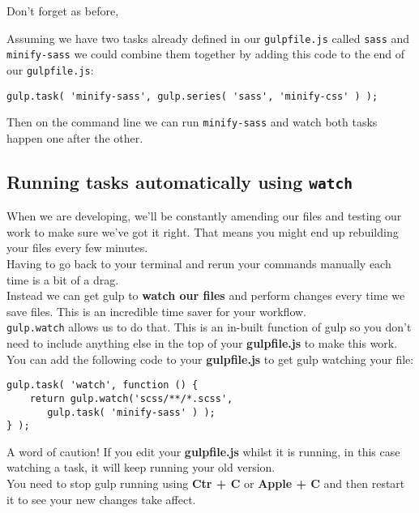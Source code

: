 Don't forget as before,

Assuming we have two tasks already defined in our \texttt{gulpfile.js} called \texttt{sass} and \texttt{minify-sass} we could combine them together by adding this code to the end of our \texttt{gulpfile.js}:

	\begin{verbatim}
gulp.task( 'minify-sass', gulp.series( 'sass', 'minify-css' ) );
	\end{verbatim}

Then on the command line we can run \texttt{minify-sass} and watch both tasks happen one after the other.
\\


\subsection{Running tasks automatically using \texttt{watch}}

When we are developing, we'll be constantly amending our files and testing our work to make sure we've got it right. That means you might end up rebuilding your files every few minutes.
\\

Having to go back to your terminal and rerun your commands manually each time is a bit of a drag.
\\

Instead we can get gulp to \textbf{watch our files} and perform changes every time we save files. This is an incredible time saver for your workflow.
\\

\texttt{gulp.watch} allows us to do that. This is an in-built function of gulp so you don't need to include anything else in the top of your \textbf{gulpfile.js} to make this work.
\\

You can add the following code to your \textbf{gulpfile.js} to get gulp watching your file:

	\begin{verbatim}
gulp.task( 'watch', function () {
    return gulp.watch('scss/**/*.scss',
       gulp.task( 'minify-sass' ) );
} );
	\end{verbatim}

A word of caution! If you edit your \textbf{gulpfile.js} whilst it is running, in this case watching a task, it will keep running your old version.
\\

You need to stop gulp running using \textbf{Ctr + C} or \textbf{Apple + C} and then restart it to see your new changes take affect.

